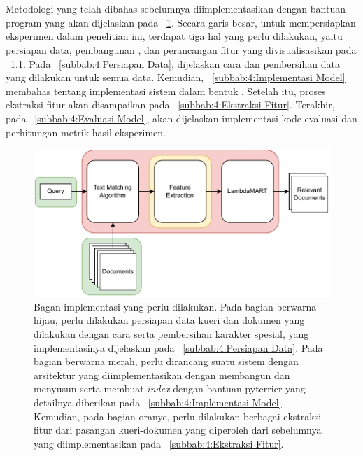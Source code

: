 \chapter{\babEmpat}
\label{bab:4}
Metodologi yang telah dibahas sebelumnya diimplementasikan dengan bantuan program yang akan dijelaskan pada \bab{}~\ref{bab:4}. Secara garis besar, untuk mempersiapkan eksperimen dalam penelitian ini, terdapat tiga hal yang perlu dilakukan, yaitu persiapan data, pembangunan \pipeline{}, dan perancangan fitur yang divisualisasikan pada \gambar{}~\ref{fig:bagan}. Pada \subbab{}~\ref{subbab:4:Persiapan Data}, dijelaskan cara \parsing{} dan pembersihan data yang dilakukan untuk semua \file{} data. Kemudian, \subbab{}~\ref{subbab:4:Implementasi Model} membahas tentang implementasi sistem \ir{} dalam bentuk \pipeline{}. Setelah itu, proses ekstraksi fitur akan disampaikan pada \subbab{}~\ref{subbab:4:Ekstraksi Fitur}. Terakhir, pada \subbab{}~\ref{subbab:4:Evaluasi Model}, akan dijelaskan implementasi kode evaluasi dan perhitungan metrik hasil eksperimen.
\begin{figure}[!ht]
    \centering
    \includegraphics[scale=0.85]{assets/pdfs/GarisBesarImplementasi.pdf}
    \caption{Bagan implementasi yang perlu dilakukan. Pada bagian berwarna hijau, perlu dilakukan persiapan data kueri dan dokumen yang dilakukan dengan cara \parsing{} serta pembersihan karakter spesial, yang implementasinya dijelaskan pada \subbab{}~\ref{subbab:4:Persiapan Data}. Pada bagian berwarna merah, perlu dirancang suatu sistem \ir{} dengan arsitektur \cascaded{} yang diimplementasikan dengan membangun dan menyusun \pipeline{} serta membuat \textit{index} dengan bantuan \library{} pyterrier yang detailnya diberikan pada \subbab{}~\ref{subbab:4:Implementasi Model}. Kemudian, pada bagian oranye, perlu dilakukan berbagai ekstraksi fitur dari pasangan kueri-dokumen yang diperoleh dari \pipeline{} sebelumnya yang diimplementasikan pada \subbab{}~\ref{subbab:4:Ekstraksi Fitur}.}
    \label{fig:bagan}
\end{figure}

